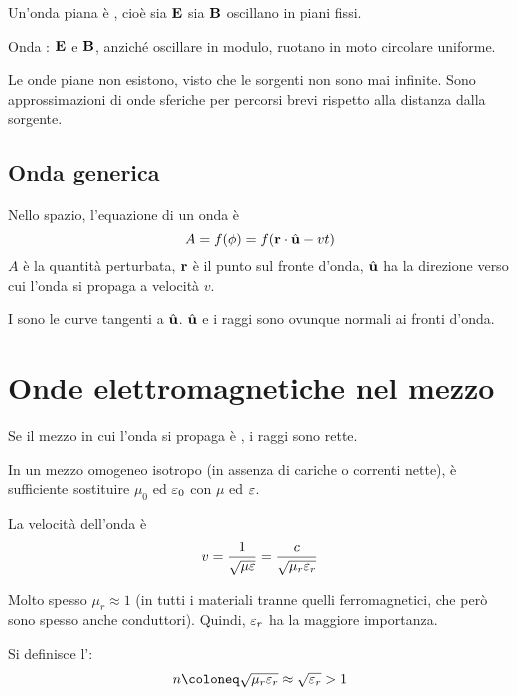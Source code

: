 Un'onda piana è , cioè sia $\mathbf{E}$ sia $\mathbf{B}$ oscillano in piani fissi.


Onda : $\mathbf{E}$ e $\mathbf{B}$, anziché oscillare in modulo, ruotano in moto circolare uniforme.

Le onde piane non esistono, visto che le sorgenti non sono mai infinite.
Sono approssimazioni di onde sferiche per percorsi brevi rispetto alla distanza dalla sorgente.


\subsection{Onda generica}

Nello spazio, l'equazione di un onda è
\begin{equation}
    A = f(\phi) = f(\mathbf{r} \cdot \hat{\mathbf{u}} - vt)
\end{equation}
$A$ è la quantità perturbata, $\mathbf{r}$ è il punto sul fronte d'onda, $\hat{\mathbf{u}}$ ha la direzione verso cui l'onda si propaga a velocità $v$.

I  sono le curve tangenti a $\hat{\mathbf{u}}$.
$\hat{\mathbf{u}}$ e i raggi sono ovunque normali ai fronti d'onda.

\section{Onde elettromagnetiche nel mezzo}

Se il mezzo in cui l'onda si propaga è , i raggi sono rette.

In un mezzo omogeneo isotropo (in assenza di cariche o correnti nette), è sufficiente sostituire $\mu_0$ ed $\varepsilon_0$ con $\mu$ ed $\varepsilon$.

La velocità dell'onda è
\begin{equation}
    v = \frac{1}{\sqrt{\mu \varepsilon}} = \frac{c}{\sqrt{\mu_r \varepsilon_r}}
\end{equation}

Molto spesso $\mu_r \approx 1$ (in tutti i materiali tranne quelli ferromagnetici, che però sono spesso anche conduttori).
Quindi, $\varepsilon_r$ ha la maggiore importanza.

Si definisce l':
\begin{equation}
    n \coloneq \sqrt{\mu_r \eps_r} \approx \sqrt{\eps_r} > 1
\end{equation}

